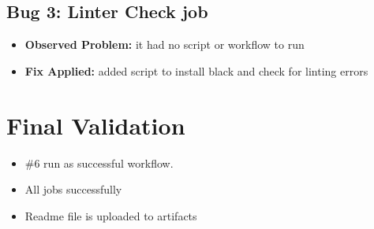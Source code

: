 \documentclass[12pt]{article}
\begin{document}
\subsection{Bug 3: Linter Check job}
\begin{itemize}[leftmargin=*]
    \item \textbf{Observed Problem:} it had no script or workflow to run
    \item \textbf{Fix Applied:} added script to install black and check for linting errors
\end{itemize}



\section{Final Validation}
\begin{itemize}[leftmargin=*]
    \item \#6 run as successful workflow.
    \item All jobs successfully
    \item Readme file is uploaded to artifacts
\end{itemize}
\end{document}

